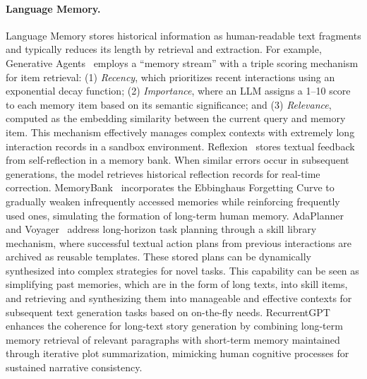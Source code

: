 \documentclass[11pt, a4paper, logo, copyright, nonumbering]{map}
\begin{document}
\paragraph{Language Memory.} 
Language Memory stores historical information as human-readable text fragments and typically reduces its length by retrieval and extraction. 
For example, 
Generative Agents~\citep{generative-agents} employs a ``memory stream'' with a triple scoring mechanism for item retrieval: (1) \textit{Recency}, which prioritizes recent interactions using an exponential decay function; (2) \textit{Importance}, where an LLM assigns a 1–10 score to each memory item based on its semantic significance; and (3) \textit{Relevance}, computed as the embedding similarity between the current query and memory item. This mechanism effectively manages complex contexts with extremely long interaction records in a sandbox environment.
Reflexion~\citep{reflexion} stores textual feedback from self-reflection in a memory bank. When similar errors occur in subsequent generations, the model retrieves historical reflection records for real-time correction. 
MemoryBank~\citep{DBLP:conf/aaai/ZhongGGYW24} incorporates the Ebbinghaus Forgetting Curve to gradually weaken infrequently accessed memories while reinforcing frequently used ones, simulating the formation of long-term human memory. 
AdaPlanner~\citep{adaplanner} and Voyager~\citep{voyager} address long-horizon task planning through a skill library mechanism, where successful textual action plans from previous interactions are archived as reusable templates. These stored plans can be dynamically synthesized into complex strategies for novel tasks. This capability can be seen as simplifying past memories, which are in the form of long texts, into skill items, and retrieving and synthesizing them into manageable and effective contexts for subsequent text generation tasks based on on-the-fly needs. 
RecurrentGPT~\citep{recurrentgpt} enhances the coherence for long-text story generation by combining long-term memory retrieval of relevant paragraphs with short-term memory maintained through iterative plot summarization, mimicking human cognitive processes for sustained narrative consistency.
\end{document}
